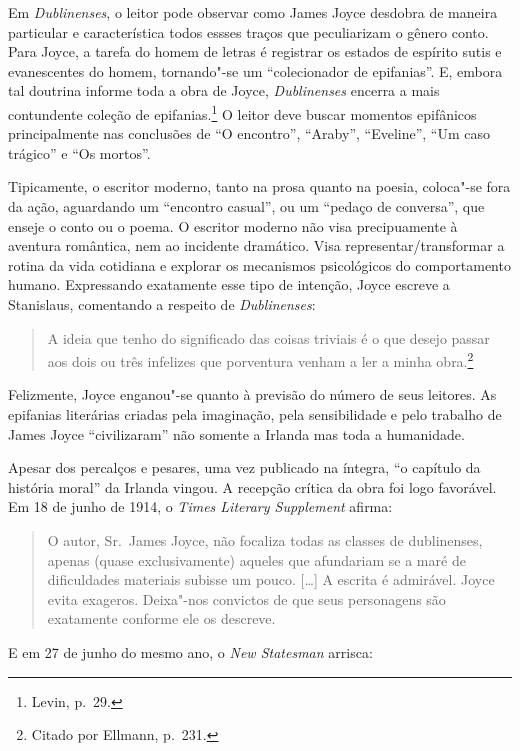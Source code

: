 Em \textit{Dublinenses}, o leitor pode observar como James Joyce desdobra de maneira particular e característica todos essses traços que peculiarizam o gênero conto.
Para Joyce, a tarefa do homem de letras é registrar os estados de
espírito sutis e evanescentes do homem, tornando"-se um “colecionador de epifanias”. E,
embora tal doutrina informe toda a obra de Joyce, \textit{Dublinenses} encerra a
mais contundente coleção de epifanias.\footnote{ Levin, p.~29.} O leitor deve buscar
momentos epifânicos principalmente nas conclusões de “O encontro”, “Araby”,
“Eveline”, “Um caso trágico” e “Os mortos”.

Tipicamente, o escritor moderno, tanto na prosa quanto na poesia, coloca"-se fora
da ação, aguardando um “encontro casual”, ou um “pedaço de conversa”, que
enseje o conto ou o poema. O escritor moderno não visa precipuamente à aventura
romântica, nem ao incidente dramático. Visa representar/transformar a rotina da
vida cotidiana e explorar os mecanismos psicológicos do comportamento humano.
Expressando exatamente esse tipo de intenção, Joyce escreve a Stanislaus,
comentando a respeito de \textit{Dublinenses}: 

\begin{quote}
A ideia que tenho do significado
das coisas triviais é o que desejo passar aos dois ou três infelizes que
porventura venham a ler a minha obra.\footnote{ Citado por Ellmann, p.~231.}
\end{quote}

Felizmente, Joyce enganou"-se quanto à previsão do número de seus leitores. As
epifanias literárias criadas pela imaginação, pela sensibilidade e pelo
trabalho de James Joyce “civilizaram” não somente a Irlanda mas toda a
humanidade.

Apesar dos percalços e pesares, uma vez publicado na íntegra, “o capítulo da
história moral” da Irlanda vingou. A recepção crítica da obra foi logo
favorável.  Em 18 de junho de 1914, o \textit{Times Literary Supplement}
afirma:

\begin{quote}
O autor, Sr.~James Joyce, não focaliza todas as classes de dublinenses, apenas
(quase exclusivamente) aqueles que afundariam se a maré de dificuldades
materiais subisse um pouco. [\ldots{}] A escrita é admirável. Joyce evita exageros.
Deixa"-nos convictos de que seus personagens são exatamente conforme ele os
descreve.
\end{quote}

E em 27 de junho do mesmo ano, o \textit{New Statesman} arrisca:

